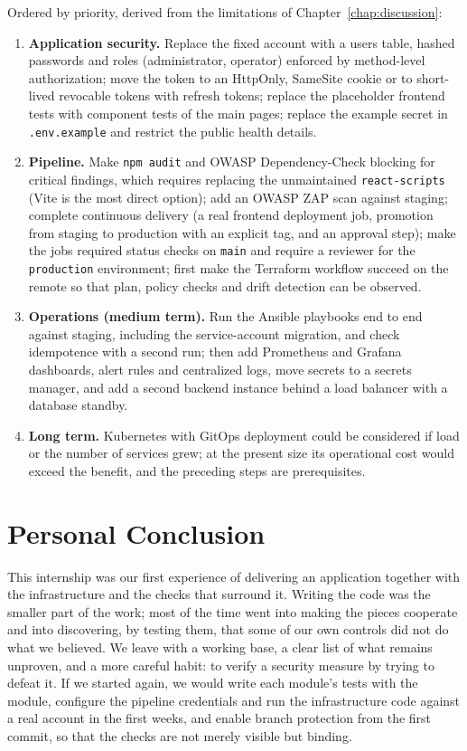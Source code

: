 Ordered by priority, derived from the limitations of Chapter~\ref{chap:discussion}:
\begin{enumerate}
  \item \textbf{Application security.} Replace the fixed account with a users table, hashed passwords and roles (administrator, operator) enforced by method-level authorization; move the token to an HttpOnly, SameSite cookie or to short-lived revocable tokens with refresh tokens; replace the placeholder frontend tests with component tests of the main pages; replace the example secret in \texttt{.env.example} and restrict the public health details.
  \item \textbf{Pipeline.} Make \texttt{npm audit} and OWASP Dependency-Check blocking for critical findings, which requires replacing the unmaintained \texttt{react-scripts} (Vite is the most direct option); add an OWASP ZAP scan against staging; complete continuous delivery (a real frontend deployment job, promotion from staging to production with an explicit tag, and an approval step); make the jobs required status checks on \texttt{main} and require a reviewer for the \texttt{production} environment; first make the Terraform workflow succeed on the remote so that plan, policy checks and drift detection can be observed.
  \item \textbf{Operations (medium term).} Run the Ansible playbooks end to end against staging, including the service-account migration, and check idempotence with a second run; then add Prometheus and Grafana dashboards, alert rules and centralized logs, move secrets to a secrets manager, and add a second backend instance behind a load balancer with a database standby.
  \item \textbf{Long term.} Kubernetes with GitOps deployment could be considered if load or the number of services grew; at the present size its operational cost would exceed the benefit, and the preceding steps are prerequisites.
\end{enumerate}

\section{Personal Conclusion}

This internship was our first experience of delivering an application together with the infrastructure and the checks that surround it. Writing the code was the smaller part of the work; most of the time went into making the pieces cooperate and into discovering, by testing them, that some of our own controls did not do what we believed. We leave with a working base, a clear list of what remains unproven, and a more careful habit: to verify a security measure by trying to defeat it. If we started again, we would write each module's tests with the module, configure the pipeline credentials and run the infrastructure code against a real account in the first weeks, and enable branch protection from the first commit, so that the checks are not merely visible but binding.
